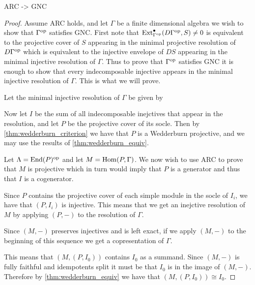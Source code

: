 \begin{theorem}
	ARC -> GNC
	\begin{proof}
		Assume ARC holds, and let $\Gamma$ be a finite dimensional algebra we wish to show that $\Gamma^{\operatorname{op}}$ satisfies GNC. First note that $\operatorname{Ext}^\bullet_{\Gamma^{\operatorname{op}}}(D\Gamma^{\operatorname{op}}, S) \neq 0$ is equivalent to the projective cover of $S$ appearing in the minimal projective resolution of $D\Gamma^{\operatorname{op}}$ which is equivalent to the injective envelope of $DS$ appearing in the minimal injective resolution of $\Gamma$. Thus to prove that $\Gamma^{\operatorname{op}}$ satisfies GNC it is enough to show that every indecomposable injective appears in the minimal injective resolution of $\Gamma$. This is what we will prove.
		
		Let the minimal injective resolution of $\Gamma$ be given by 
		\begin{center}
		\end{center}
		Now let $I$ be the sum of all indecomposable inejctives that appear in the resolution, and let $P$ be the projective cover of its socle. Then by \cref{thm:wedderburn_criterion} we have that $P$ is a Wedderburn projective, and we may use the results of \cref{thm:wedderburn_equiv}.
		
		Let $\Lambda = \operatorname{End}(P)^{\operatorname{op}}$ and let $M = \operatorname{Hom}(P, \Gamma)$. We now wish to use ARC to prove that $M$ is projective which in turn would imply that $P$ is a generator and thus that $I$ is a cogenerator.
		
		Since $P$ contains the projective cover of each simple module in the socle of $I_i$, we have that $(P,I_i)$ is injective. This means that we get an inejctive resolution of $M$ by applying $(P,-)$ to the resolution of $\Gamma$.
		\begin{center}
		\end{center}
		Since $(M,-)$ preserves injectives and is left exact, if we apply $(M,-)$ to the beginning of this sequence we get a copresentation of $\Gamma$.
		\begin{center}
		\end{center}
		This means that $(M, (P,I_0))$ contains $I_0$ as a summand. Since $(M,-)$ is fully faithful and idempotents split it must be that $I_0$ is in the image of $(M,-)$. Therefore by \cref{thm:wedderburn_equiv} we have that $(M, (P,I_0)) \cong I_0$.
		

\end{proof}
\end{theorem}
